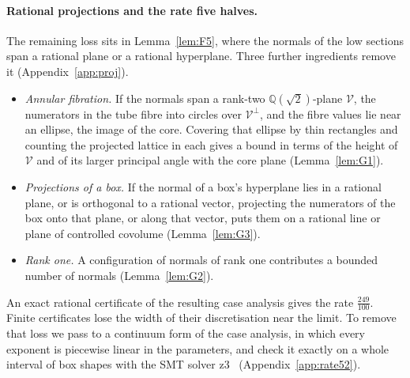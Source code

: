 \documentclass[aps,prx,twocolumn,superscriptaddress,nofootinbib,longbibliography]{revtex4-2}
\theoremstyle{plain}
\theoremstyle{definition}
\theoremstyle{remark}
\newcommand{\Q}{\mathbb{Q}}
\begin{document}
\paragraph{Rational projections and the rate five halves.} The remaining loss sits in Lemma~\ref{lem:F5}, where the normals of the low sections span a rational plane or a rational hyperplane. Three further ingredients remove it (Appendix~\ref{app:proj}).
\begin{itemize}
\item \emph{Annular fibration.} If the normals span a rank-two $\Q(\sqrt2)$-plane $\mathcal V$, the numerators in the tube fibre into circles over $\mathcal V^\perp$, and the fibre values lie near an ellipse, the image of the core. Covering that ellipse by thin rectangles and counting the projected lattice in each gives a bound in terms of the height of $\mathcal V$ and of its larger principal angle with the core plane (Lemma~\ref{lem:G1}).
\item \emph{Projections of a box.} If the normal of a box's hyperplane lies in a rational plane, or is orthogonal to a rational vector, projecting the numerators of the box onto that plane, or along that vector, puts them on a rational line or plane of controlled covolume (Lemma~\ref{lem:G3}).
\item \emph{Rank one.} A configuration of normals of rank one contributes a bounded number of normals (Lemma~\ref{lem:G2}).
\end{itemize}
An exact rational certificate of the resulting case analysis gives the rate $\tfrac{249}{100}$. Finite certificates lose the width of their discretisation near the limit. To remove that loss we pass to a continuum form of the case analysis, in which every exponent is piecewise linear in the parameters, and check it exactly on a whole interval of box shapes with the SMT solver z3~\cite{Z3} (Appendix~\ref{app:rate52}).
\end{document}
